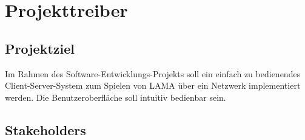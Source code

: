 \chapter{Projekttreiber}

\section{Projektziel}

Im Rahmen des Software-Entwicklungs-Projekts {\the\year} soll ein einfach zu bedienendes Client-Server-System zum Spielen von LAMA über ein Netzwerk implementiert werden. Die Benutzeroberfläche soll intuitiv bedienbar sein.

\section{Stakeholders}

\setcounter{sh}{10}


